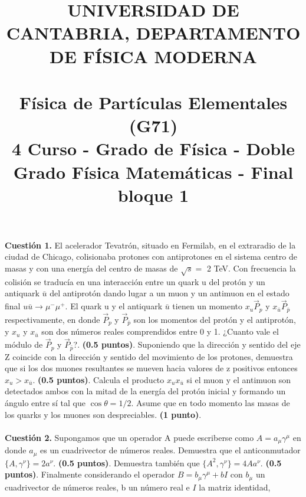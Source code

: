 \documentclass[paper=a4, fontsize=11pt]{scrartcl} %
\date{}
\title{	
\normalfont \normalsize 
\textsc{UNIVERSIDAD DE CANTABRIA, DEPARTAMENTO DE FÍSICA MODERNA} \\ [20pt] %
\horrule{0.5pt} \\[0.4cm] %
\huge Física de Partículas Elementales (G71) \\ %
\normalsize 4 Curso - Grado de Física - Doble Grado Física Matemáticas - Final bloque 1
\horrule{2pt} \\[0.5cm] %
}
\numberwithin{equation}{section} %
\numberwithin{figure}{section} %
\numberwithin{table}{section} %
\begin{document}
\maketitle %

\vspace{-2.5cm}

\textbf{Cuestión 1.} El acelerador Tevatrón, situado en Fermilab, en el extraradio de la ciudad de Chicago, colisionaba protones
con antiprotones en el sistema centro de masas y con una energía del centro de masas de $\sqrt{s}=$ 2 TeV. Con frecuencia la colisión
se traducía en una interacción entre un quark u del protón y un antiquark $\bar{u}$ del antiprotón dando lugar a un muon y un antimuon en 
el estado final $u\bar{u}\rightarrow\mu^{-}\mu^{+}$. El quark u y el antiquark $\bar{u}$ tienen un momento $x_u\vec{P}_p$ y $x_{\bar{u}}\vec{P}_{\bar{p}}$
respectivamente, en donde $\vec{P}_p$ y $\vec{P}_{\bar{p}}$ son los momentos del protón y el antiprotón, y $x_u$ y $x_{\bar{u}}$ son dos números reales
comprendidos entre 0 y 1. ¿Cuanto vale el módulo de $\vec{P}_p$ y $\vec{P}_{\bar{p}}$?. \textbf{(0.5 puntos)}. Suponiendo que la dirección y sentido
del eje Z coincide con la dirección y sentido del movimiento de los protones, demuestra que si los dos muones resultantes se mueven hacia valores de z
positivos entonces $x_u>x_{\bar{u}}$. \textbf{(0.5 puntos)}. Calcula el producto $x_ux_{\bar{u}}$ si el muon y el antimuon son detectados ambos
con la mitad de la energía del protón inicial y formando un ángulo entre sí tal que $\cos{\theta}=1/2$. Asume que en todo momento las masas de los quarks
y los muones son despreciables. \textbf{(1 punto)}.
\\
\\
\textbf{Cuestión 2.} Supongamos que un operador A puede escriberse como $A=a_\mu\gamma^\mu$ en donde $a_\mu$ es un cuadrivector de números reales. 
Demuestra que el anticonmutador $\{A, \gamma^\nu\}=2a^{\nu}$. \textbf{(0.5 puntos)}. Demuestra también que $\{A^2, \gamma^\nu\}=4Aa^\nu$. \textbf{(0.5 puntos)}.
Finalmente considerando el operador $B=b_\mu\gamma^\mu+bI$ con $b_\mu$ un cuadrivector de números reales, b un número real e $I$ la matriz identidad,
\end{document}
